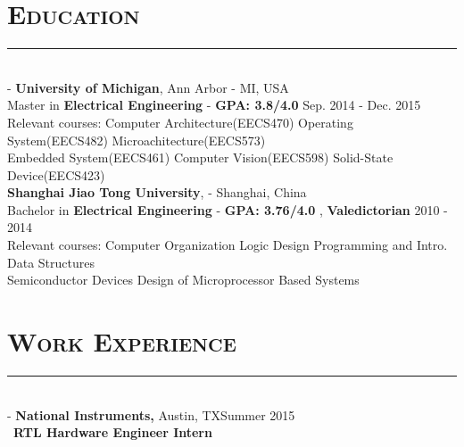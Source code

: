 \documentclass[11pt]{res}
\newcommand{\style}[1]{\color{Blue}\large\textsc{#1}}
\begin{document}
\begin{resume}
\section{\style{Education}}
\vspace{-10pt}
\rule{18cm}{0.5mm}\\
 -\sectionwidth \resumewidth
{\textbf {University of Michigan}, Ann Arbor - MI, USA \\}
{Master in \textbf{Electrical Engineering} - \textbf{GPA: 3.8/4.0}    \hfill Sep. 2014 - Dec. 2015\hspace{-0.58in} \vspace{-0.8mm}\\}
{Relevant courses: Computer Architecture(EECS470) \hspace{0.2cm} Operating System(EECS482) \hspace{0.2cm} Microachitecture(EECS573)\\}
{\indent \hspace{2.75cm}   Embedded System(EECS461) \hspace{0.2cm} Computer Vision(EECS598) \hspace{0.2cm} Solid-State Device(EECS423) \\}
{\textbf {Shanghai Jiao Tong University},  - Shanghai, China \\}
{Bachelor in \textbf{Electrical Engineering} - \textbf{GPA: 3.76/4.0} , \textbf{Valedictorian}   \hfill 2010 - 2014\hspace{-0.58in} \vspace{-0.8mm}\\}
{Relevant courses: Computer Organization \hspace{0.3cm}  Logic Design \hspace{0.3cm}Programming and Intro. Data Structures\\}
{\indent \hspace{2.75cm}  Semiconductor Devices \hspace{0.3cm} Design of Microprocessor Based Systems\\}
  
 \vspace{-25pt}
\section{\style{Work Experience}}
\vspace{-10pt}
\rule{18cm}{0.5mm}\\
 -\sectionwidth \resumewidth
{\textbf{National Instruments,}  Austin, TX\hfill Summer 2015} \hspace{-0.58in}\vspace{-0mm}\\\
  \textbf{RTL Hardware Engineer Intern} \\
 \vspace{-14pt}


\end{resume}
\end{document}
